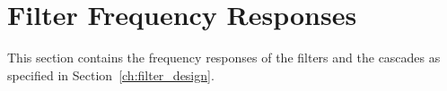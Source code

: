 %
%
\section{Filter Frequency Responses} %
\label{sec:filter_frequency_responses}

This section contains the frequency responses  of the filters and the cascades
as specified in Section~\ref{ch:filter_design}.
%
%
\subsection{} %
\label{sec:filter_frequency_responses:5steep}

%
%
\subsection{} %
\label{sec:filter_frequency_responses:5flat}

%
%
\subsection{} %
\label{sec:filter_frequency_responses:2steep}

%
%
